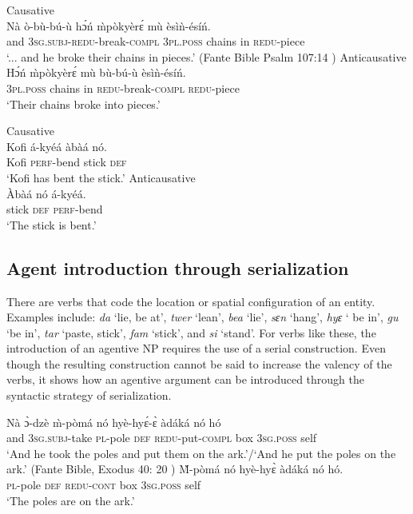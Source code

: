 \documentclass[output=paper]{langsci/langscibook}
\begin{document}
\ea\label{ex:42.osam}
\ea\label{ex:42a.osam} Causative \\
\gll  Nà  ò-bù-bú-ù      hɔ́ń    \`{m}pòkyèr\'{ɛ}  mù   èsìǹ-ésíń.\\
     and  \textsc{3sg.subj}-\textsc{redu}-break-\textsc{compl}  \textsc{3pl.poss}  chains    in  \textsc{redu}-piece\\
\glt `... and he broke their chains in pieces.' (Fante Bible Psalm 107:14 \citep{bible1974})
\ex\label{ex:42b.osam} Anticausative\\
\gll Hɔ́ń  \`{m}pòkyèr\'{ɛ}   mù  bù-bú-ù     èsìǹ-ésíń.\\
     \textsc{3pl.poss}  chains    in  \textsc{redu}-break-\textsc{compl}  \textsc{redu}-piece\\
\glt `Their chains broke into pieces.'
\z 
\z 


\ea\label{ex:43.osam}
\ea\label{ex:43a.osam} Causative \\
\gll Kofi  á-kyéá    àbàá  nó.\\
     Kofi  \textsc{perf}-bend  stick  \textsc{def}\\
\glt `Kofi has bent the stick.'
\ex\label{ex:43b.osam} Anticausative \\
\gll Àbàá  nó  á-kyéá.\\
     stick  \textsc{def}  \textsc{perf}-bend\\
\glt `The stick is bent.'
\z 
\z 


\subsection{Agent introduction through serialization}\label{§5.2:agent.osam}

There are verbs that code the location or spatial configuration of an entity. Examples  include: \textit{da} `lie, be at', \textit{twer} `lean', \textit{bea} `lie', \textit{sɛn} `hang', \textit{hyɛ} ` be in', \textit{gu} `be in', \textit{tar} `paste, stick', \textit{fam} `stick', and \textit{si} `stand'. For verbs like these, the introduction of an agentive NP requires the use of a serial construction. Even though the resulting construction cannot be said to increase the valency of the verbs, it shows how an agentive argument can be introduced through the syntactic strategy of serialization.

\ea\label{ex:44.osam}
\ea\label{ex:44a.osam}
\gll  Nà  ɔ̀-dzè     \`{m}-pòmá   nó  hyè-hy\'{ɛ}-\`{ɛ}  àdáká     nó    hó \\
             and  \textsc{3sg.subj}-take  \textsc{pl}-pole    \textsc{def}  \textsc{redu}-put-\textsc{compl} box    \textsc{3sg.poss}  self  \\
\glt  `And he took the poles and put them on the ark.'/`And he put the poles on the ark.' (Fante Bible, Exodus 40: 20 \citep{bible1974})
\ex\label{ex:44b.osam}
\gll    \`{M}-pòmá   nó   hyè-hy\`{ɛ}   àdáká  nó    hó.\\
       \textsc{pl}-pole    \textsc{def}  \textsc{redu-cont}  box  \textsc{3sg.poss}  self  \\
\glt   `The poles are on the ark.'
\z 
\z 
\end{document}
